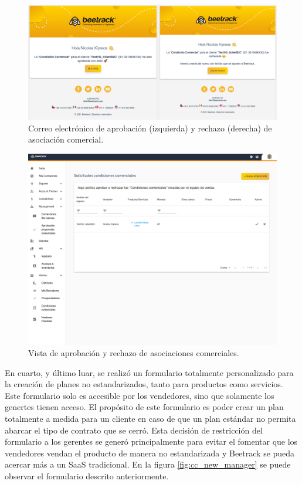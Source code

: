     \begin{figure}
      \centering
      \includegraphics[width=\linewidth]{figures/cc/mails/cc_approve_reject.jpeg}
      \caption{Correo electrónico de aprobación (izquierda) y rechazo (derecha) de asociación comercial.}
      \label{fig:cc_approve_reject}
    \end{figure}

    \begin{figure}[H]
      \centering
      \includegraphics[width=0.6\linewidth]{figures/cc/vistas/cc_review.png}
      \caption{Vista de aprobación y rechazo de asociaciones comerciales.}
      \label{fig:cc_review}
    \end{figure}


    En cuarto, y último luar, se realizó un formulario totalmente personalizado para la creación de planes no estandarizados, tanto para productos como servicios. Este formulario solo es accesible por los vendedores, sino que solamente los genertes tienen acceso. El propósito de este formulario es poder crear un plan totalmente a medida para un cliente en caso de que un plan estándar no permita abarcar el tipo de contrato que se cerró. Esta decisión de restricción del formulario a los gerentes se generó principalmente para evitar el fomentar que los vendedores vendan el producto de manera no estandarizada y Beetrack se pueda acercar más a un SaaS tradicional. En la figura \ref{fig:cc_new_manager} se puede observar el formulario descrito anteriormente.
 
